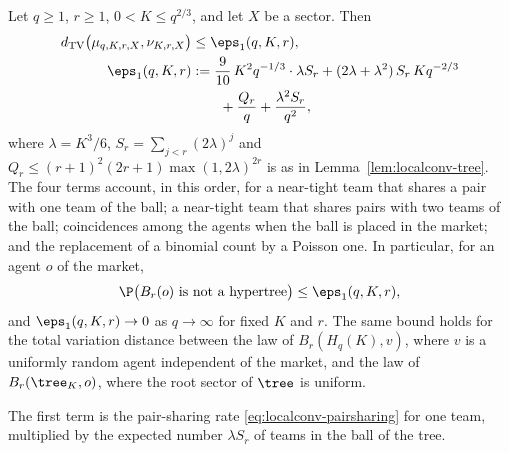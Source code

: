 \begin{theorem}\label{thm:localconv}
Let $q\ge1$, $r\ge1$, $0<K\le q^{2/3}$, and let $X$ be a sector. Then
\begin{equation}\label{eq:localconv-bound}
\begin{aligned}
d_{\mathrm{TV}}\bigl(\mu_{q,K,r,X},\nu_{K,r,X}\bigr)&\le\eps_1(q,K,r),\\
\eps_1(q,K,r)&:=\frac9{10}\,K^2q^{-1/3}\cdot\lambda S_r
+(2\lambda+\lambda^2)\,S_r\,Kq^{-2/3}\\
&\qquad+\frac{Q_r}{q}
+\frac{\lambda^2S_r}{q^2},
\end{aligned}
\end{equation}
where $\lambda=K^3/6$, $S_r=\sum_{j<r}(2\lambda)^j$ and
$Q_r\le(r+1)^2(2r+1)\max(1,2\lambda)^{2r}$ is as in Lemma~\ref{lem:localconv-tree}. The four
terms account, in this order, for a near-tight team that shares a pair with one team of the
ball; a near-tight team that shares pairs with two teams of the ball; coincidences among the
agents when the ball is placed in the market; and the replacement of a binomial count by a
Poisson one. In particular, for an agent $o$ of the market,
\[
\P\bigl(B_r(o)\text{ is not a hypertree}\bigr)\le\eps_1(q,K,r),
\]
and $\eps_1(q,K,r)\to0$ as $q\to\infty$ for fixed $K$ and $r$. The same bound holds for the
total variation distance between the law of $B_r(H_q(K),v)$, where $v$ is a uniformly random
agent independent of the market, and the law of $B_r(\tree_K,o)$, where the root sector of
$\tree$ is uniform.
\end{theorem}

The first term is the pair-sharing rate \eqref{eq:localconv-pairsharing} for one team,
multiplied by the expected number $\lambda S_r$ of teams in the ball of the tree.


